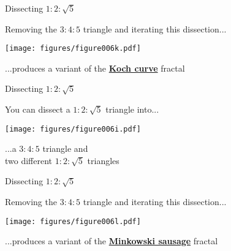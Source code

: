 \documentclass[14pt]{beamer}
\begin{document}

    \begin{frame}{Dissecting $1\!\!:\!\!2\!\!:\!\!\sqrt{5}$}
        \begin{center}
            Removing the $3\!\!:\!\!4\!\!:\!\!5$ triangle and iterating this dissection...

            \bigskip \bigskip

            \texttt{[image: figures/figure006k.pdf]}

            \bigskip \bigskip

            ...produces a variant of the \textbf{\href{https://en.wikipedia.org/wiki/Koch_snowflake}{Koch curve}} fractal\\[4ex]

        \end{center}
    \end{frame}


    \begin{frame}{Dissecting $1\!\!:\!\!2\!\!:\!\!\sqrt{5}$}
        \begin{center}
            You can dissect a $1\!\!:\!\!2\!\!:\!\!\sqrt{5}$ triangle into...

            \bigskip \bigskip

            \texttt{[image: figures/figure006i.pdf]}

            \bigskip \bigskip

            ...a $3\!\!:\!\!4\!\!:\!\!5$ triangle and\\two different $1\!\!:\!\!2\!\!:\!\!\sqrt{5}$ triangles
        \end{center}
    \end{frame}


    \begin{frame}{Dissecting $1\!\!:\!\!2\!\!:\!\!\sqrt{5}$}
        \begin{center}
            Removing the $3\!\!:\!\!4\!\!:\!\!5$ triangle and iterating this dissection...

            \bigskip \bigskip

            \texttt{[image: figures/figure006l.pdf]}

            \bigskip \bigskip

            ...produces a variant of the \textbf{\href{https://en.wikipedia.org/wiki/Minkowski_sausage}{Minkowski sausage}} fractal\\[4ex]
        \end{center}
    \end{frame}
\end{document}
